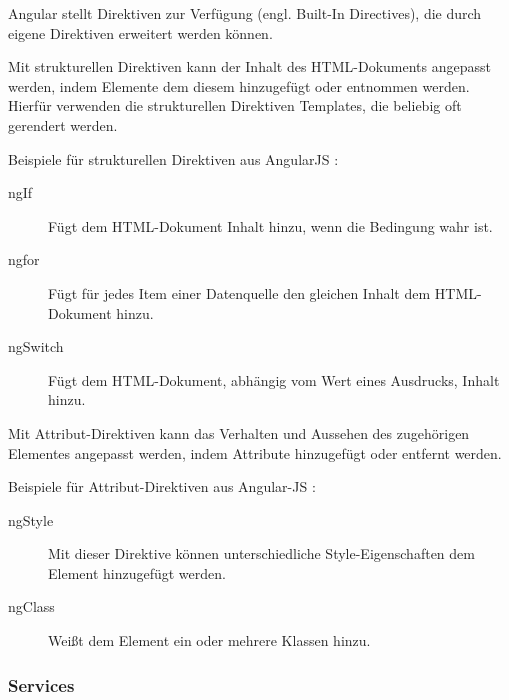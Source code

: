 Angular stellt Direktiven zur Verfügung (engl. Built-In Directives), die durch eigene Direktiven erweitert werden können. \autocite[vgl.][261]{Freeman.2018}

Mit strukturellen Direktiven kann der Inhalt des HTML-Dokuments angepasst werden, indem Elemente dem diesem hinzugefügt oder entnommen werden. Hierfür verwenden die strukturellen Direktiven Templates, die beliebig oft gerendert werden. \autocites[vgl.][269\psqq]{Steyer.2017}[vgl.][365]{Freeman.2018}

Beispiele für strukturellen Direktiven aus AngularJS \autocite[vgl.][261\psqq]{Freeman.2018}:
\begin{description}
	\item [ngIf] Fügt dem HTML-Dokument Inhalt hinzu, wenn die Bedingung wahr ist. 
	\item [ngfor] Fügt für jedes Item einer Datenquelle den gleichen Inhalt dem HTML-Dokument hinzu.
	\item [ngSwitch] Fügt dem HTML-Dokument, abhängig vom Wert eines Ausdrucks, Inhalt hinzu.
\end{description} 

Mit Attribut-Direktiven kann das Verhalten und Aussehen des zugehörigen Elementes angepasst werden, indem Attribute hinzugefügt oder entfernt werden. \autocite[vgl.][339]{Freeman.2018} 

Beispiele für Attribut-Direktiven aus Angular-JS \autocite[vgl.][249\psqq]{Freeman.2018}:
\begin{description}
	\item [ngStyle] Mit dieser Direktive können unterschiedliche Style-Eigenschaften dem Element hinzugefügt werden.
	\item [ngClass] Weißt dem Element ein oder mehrere Klassen hinzu. 
\end{description}

\subsubsection{Services}







